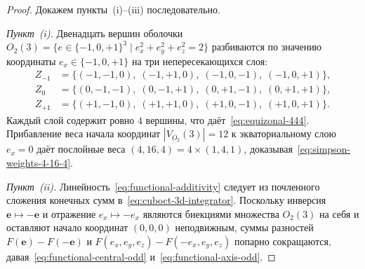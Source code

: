 \documentclass[11pt,a4paper]{article}
\theoremstyle{plain}
\theoremstyle{definition}
\begin{document}
\begin{proof}
Докажем пункты~(i)--(iii) последовательно.

\emph{Пункт~(i).} Двенадцать вершин оболочки $O_2(3) = \{e \in \{-1, 0, +1\}^3 \mid e_x^2 + e_y^2 + e_z^2 = 2\}$ разбиваются по значению координаты $e_x \in \{-1, 0, +1\}$ на три непересекающихся слоя:
\begin{align*}
  Z_{-1} &= \bigl\{(-1, -1, 0),\; (-1, +1, 0),\; (-1, 0, -1),\; (-1, 0, +1)\bigr\}, \\
  Z_{0} &= \bigl\{(0, -1, -1),\; (0, -1, +1),\; (0, +1, -1),\; (0, +1, +1)\bigr\}, \\
  Z_{+1} &= \bigl\{(+1, -1, 0),\; (+1, +1, 0),\; (+1, 0, -1),\; (+1, 0, +1)\bigr\}.
\end{align*}
Каждый слой содержит ровно $4$ вершины, что даёт~\eqref{eq:equizonal-444}. Прибавление веса начала координат $|V_{O_2}(3)| = 12$ к экваториальному слою $e_x = 0$ даёт послойные веса $(4, 16, 4) = 4\times(1, 4, 1)$, доказывая~\eqref{eq:simpson-weights-4-16-4}.

\emph{Пункт~(ii).} Линейность~\eqref{eq:functional-additivity} следует из почленного сложения конечных сумм в~\eqref{eq:cuboct-3d-integrator}. Поскольку инверсия $\mathbf{e} \mapsto -\mathbf{e}$ и отражение $e_x \mapsto -e_x$ являются биекциями множества $O_2(3)$ на себя и оставляют начало координат $(0, 0, 0)$ неподвижным, суммы разностей $F(\mathbf{e}) - F(-\mathbf{e})$ и $F(e_x, e_y, e_z) - F(-e_x, e_y, e_z)$ попарно сокращаются, давая~\eqref{eq:functional-central-odd} и~\eqref{eq:functional-axis-odd}.


\end{proof}
\end{document}
